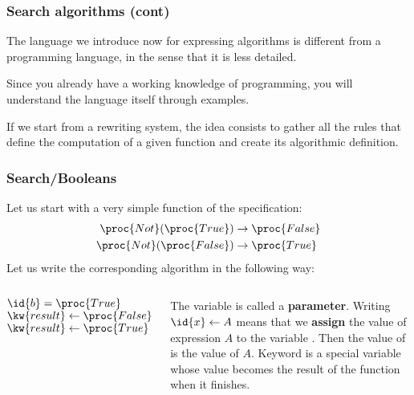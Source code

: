 %
\begin{frame}
\frametitle{Search algorithms (cont)}

The language we introduce now for expressing algorithms is different
from a programming language, in the sense that it is less detailed. 

\bigskip

Since you already have a working knowledge of programming, you will
understand the language itself through examples.

\bigskip

If we start from a rewriting system, the idea consists to gather all
the rules that define the computation of a given function and create
its algorithmic definition.

\end{frame}

%
\begin{frame}
\frametitle{Search/Booleans}

Let us start with a very simple function of the  specification:
\begin{align*}
\proc{Not} (\proc{True}) &\rightarrow \proc{False}\\
\proc{Not} (\proc{False}) &\rightarrow \proc{True}
\end{align*}
Let us write the corresponding algorithm in the following way:
\begin{columns}
    \begin{codebox}
      \zi	\If \(\id{b} = \proc{True}\)
      \zi	\Then \(\kw{result} \gets \proc{False}\)
      \zi	\Else \(\kw{result} \gets \proc{True}\)
      \zi	\End
    \end{codebox}
    The variable  is called a \textbf{parameter}.
    Writing \(\id{x} \gets A\) means that we \textbf{assign} the value
    of expression \(A\) to the variable . Then the value of
     is the value of \(A\). Keyword  is a special
    variable whose value becomes the result of the function when it
    finishes.
\end{columns}

\end{frame}

